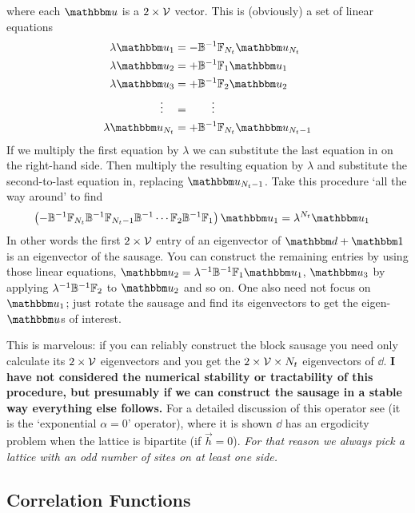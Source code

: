 where each $\uu$ is a $2\times\mathcal{V}$ vector.
This is (obviously) a set of linear equations
\begin{align*}
	\lambda \uu_1 &= -\BB\inverse \FF_{N_t} \uu_{N_t}
    \\
	\lambda \uu_2 &=+\BB\inverse \FF_{1} \uu_{1}
    \\
	\lambda \uu_3 &= +\BB\inverse \FF_{2} \uu_{2}
    \\
    \vdots \quad &= \qquad \vdots
    \\
    \lambda \uu_{N_t} &= +\BB\inverse \FF_{N_t} \uu_{N_t-1}
\end{align*}
If we multiply the first equation by $\lambda$ we can substitute the last equation in on the right-hand side.
Then multiply the resulting equation by $\lambda$ and substitute the second-to-last equation in, replacing $\uu_{N_t-1}$.
Take this procedure `all the way around' to find
\begin{align}
    \left(-\BB\inverse \FF_{N_t} \BB\inverse \FF_{N_t-1} \BB\inverse \cdots \FF_2 \BB\inverse \FF_1 \right) \uu_1 &= \lambda^{N_t} \uu_1
\end{align}
In other words the first $2\times\mathcal{V}$ entry of an eigenvector of $\dd+\one$ is an eigenvector of the sausage.
You can construct the remaining entries by using those linear equations, $\uu_2 = \lambda\inverse\BB\inverse \FF_1 \uu_1$, $\uu_3$ by applying $\lambda^{-1} \mathbb{B}^{-1} \mathbb{F}_2$ to $\uu_2$ and so on.
One also need not focus on $\uu_1$; just rotate the sausage and find its eigenvectors to get the eigen-$\uu$s of interest.

This is marvelous: if you can reliably construct the block sausage you need only calculate its $2\times\mathcal{V}$ eigenvectors and you get the $2\times\mathcal{V}\times N_t$ eigenvectors of $\dd$.
{\bf I have not considered the numerical stability or tractability of this procedure, but presumably if we can construct the sausage in a stable way everything else follows.}
For a detailed discussion of this operator see  (it is the `exponential $\alpha=0$' operator), where it is shown $\dd$ has an ergodicity problem when the lattice is bipartite (if $\vec{h}=0$).
\emph{For that reason we always pick a lattice with an odd number of sites on at least one side.}

\subsection{Correlation Functions}\label{sec:correlation functions}

